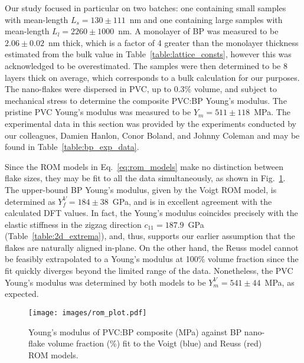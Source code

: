 Our study focused in particular on two batches:
one containing small samples 
with mean-length $L_s=130\pm111$~nm 
and one containing large samples 
with mean-length $L_l=2260\pm1000$~nm.
% 
A monolayer of BP was measured 
to be $2.06\pm0.02$~nm thick, 
which is a factor of 4 greater than the 
monolayer thickness estimated from 
the bulk value in Table~\ref{table:lattice_consts}, 
however this was acknowledged to be overestimated.
%
The samples were then determined to be 
8 layers thick on average, 
which corresponds to a bulk calculation
for our purposes.
%
The nano-flakes were dispersed in PVC, 
up to 0.3\% volume, 
and subject to mechanical stress to 
determine the composite PVC:BP 
Young's modulus.
%
The pristine PVC Young's modulus 
was measured to be $Y_m=511\pm118$~MPa.
%
The experimental data in this section was 
provided by the experiments 
conducted by our colleagues, 
Damien Hanlon, 
Conor Boland, and Johnny Coleman 
and may be found in Table~\ref{table:bp_exp_data}.

Since the ROM models 
in Eq.~\eqref{eq:rom_models} make
no distinction between flake sizes, 
they may be fit to all the data simultaneously, 
as shown in Fig.~\ref{fig:rom_plot}.
%
The upper-bound BP Young's modulus, 
given by the Voigt ROM model, 
is determined as  
$Y_f^V=184\pm 38$~GPa, 
and is in excellent agreement 
with the calculated DFT values.
%
In fact, the Young's modulus 
coincides precisely with the elastic stiffness in 
the zigzag direction $c_{11}=187.9$~GPa 
(Table~\ref{table:2d_extrema}), 
and, thus, supports our earlier assumption 
that the flakes are naturally aligned in-plane.
%
On the other hand, 
the Reuss model 
cannot be feasibly extrapolated 
to a Young's modulus at 100\% volume fraction
since the fit quickly diverges 
beyond the limited range of the data.
%
Nonetheless, 
the PVC Young's modulus was determined 
by both models to be 
$Y_m^V=541\pm 44$~MPa, 
as expected.

\begin{figure}[th!]
\centering
\texttt{[image: images/rom\_plot.pdf]}
\caption[PVC:BP Young's modulus fit to rule-of-mixtures model]{
Young's modulus of PVC:BP composite (MPa) 
against BP nano-flake volume fraction (\%)
fit to the Voigt (blue) and Reuss (red) ROM models.
}
\label{fig:rom_plot}
\end{figure}


